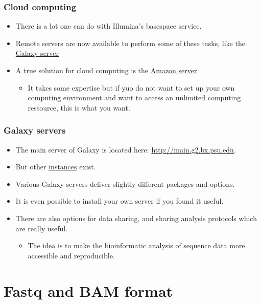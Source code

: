 \documentclass{beamer}
\begin{document}
\begin{frame}
  \frametitle{Cloud computing}
  \begin{itemize}
  \item There is a lot one can do with Illumina's basespace service.
  \item Remote servers are now available to perform some of these tasks, like the \href{main.g2.bx.psu.edu)}{Galaxy server}
  \item A true solution for cloud computing is the \href{http://aws.amazon.com/ec2}{Amazon server}.
    \begin{itemize}
    \item It takes some expertise but if yuo do not want to set up your own computing environment and want to access an unlimited computing ressource, this is what you want.
    \end{itemize}
  \end{itemize}
\end{frame}


\begin{frame}
  \frametitle{Galaxy servers}
  \begin{itemize}
  \item The main server of Galaxy is located here:  \href{http://main.g2.bx.psu.edu}{http://main.g2.bx.psu.edu}.
  \item But other \href{http://wiki.g2.bx.psu.edu/PublicGalaxyServers?action=show&redirect=Public+Galaxy+Servers}{instances}  exist.
  \item Various Galaxy servers deliver slightly different packages and options.
  \item It is even possible to install your own server if you found it useful.
  \item There are also options for data sharing, and sharing analysis protocols which are really useful.
    \begin{itemize}
    \item The idea is to make the bioinformatic analysis of sequence data more accessible and reproducible.
    \end{itemize}
  \end{itemize}
\end{frame}






\section{Fastq and BAM format}
\end{document}
